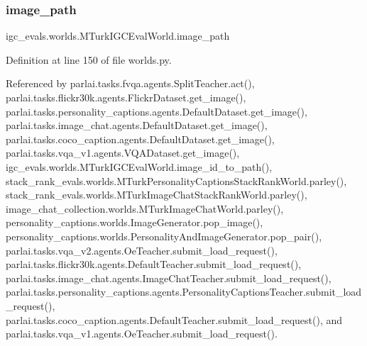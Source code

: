 \subsubsection{\texorpdfstring{image\+\_\+path}{image\_path}}
{\footnotesize\ttfamily igc\+\_\+evals.\+worlds.\+M\+Turk\+I\+G\+C\+Eval\+World.\+image\+\_\+path}



Definition at line 150 of file worlds.\+py.



Referenced by parlai.\+tasks.\+fvqa.\+agents.\+Split\+Teacher.\+act(), parlai.\+tasks.\+flickr30k.\+agents.\+Flickr\+Dataset.\+get\+\_\+image(), parlai.\+tasks.\+personality\+\_\+captions.\+agents.\+Default\+Dataset.\+get\+\_\+image(), parlai.\+tasks.\+image\+\_\+chat.\+agents.\+Default\+Dataset.\+get\+\_\+image(), parlai.\+tasks.\+coco\+\_\+caption.\+agents.\+Default\+Dataset.\+get\+\_\+image(), parlai.\+tasks.\+vqa\+\_\+v1.\+agents.\+V\+Q\+A\+Dataset.\+get\+\_\+image(), igc\+\_\+evals.\+worlds.\+M\+Turk\+I\+G\+C\+Eval\+World.\+image\+\_\+id\+\_\+to\+\_\+path(), stack\+\_\+rank\+\_\+evals.\+worlds.\+M\+Turk\+Personality\+Captions\+Stack\+Rank\+World.\+parley(), stack\+\_\+rank\+\_\+evals.\+worlds.\+M\+Turk\+Image\+Chat\+Stack\+Rank\+World.\+parley(), image\+\_\+chat\+\_\+collection.\+worlds.\+M\+Turk\+Image\+Chat\+World.\+parley(), personality\+\_\+captions.\+worlds.\+Image\+Generator.\+pop\+\_\+image(), personality\+\_\+captions.\+worlds.\+Personality\+And\+Image\+Generator.\+pop\+\_\+pair(), parlai.\+tasks.\+vqa\+\_\+v2.\+agents.\+Oe\+Teacher.\+submit\+\_\+load\+\_\+request(), parlai.\+tasks.\+flickr30k.\+agents.\+Default\+Teacher.\+submit\+\_\+load\+\_\+request(), parlai.\+tasks.\+image\+\_\+chat.\+agents.\+Image\+Chat\+Teacher.\+submit\+\_\+load\+\_\+request(), parlai.\+tasks.\+personality\+\_\+captions.\+agents.\+Personality\+Captions\+Teacher.\+submit\+\_\+load\+\_\+request(), parlai.\+tasks.\+coco\+\_\+caption.\+agents.\+Default\+Teacher.\+submit\+\_\+load\+\_\+request(), and parlai.\+tasks.\+vqa\+\_\+v1.\+agents.\+Oe\+Teacher.\+submit\+\_\+load\+\_\+request().

\mbox{\label{classigc__evals_1_1worlds_1_1MTurkIGCEvalWorld_aa203efe5c124b3400572cadb57a3774f}} 
